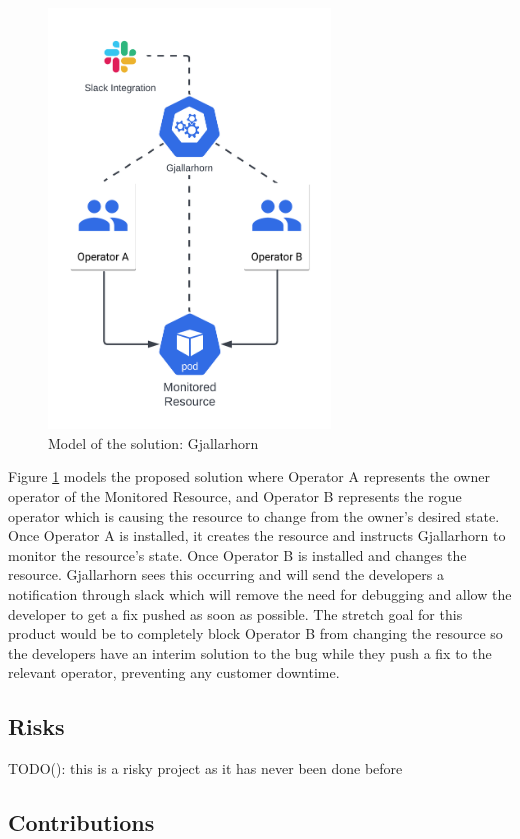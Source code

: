 \documentclass{article}
\begin{document}
\begin{figure}[!hb]
    \centering
    \includegraphics[width=75mm]{solution-model.png}
    \caption{Model of the solution: Gjallarhorn}
    \label{solution-model}
\end{figure}

Figure \ref{solution-model} models the proposed solution where Operator A represents the owner 
operator of the Monitored Resource, and Operator B represents the rogue operator which is 
causing the resource to change from the owner’s desired state. Once Operator A is installed, 
it creates the resource and instructs Gjallarhorn to monitor the resource’s state. Once Operator 
B is installed and changes the resource. Gjallarhorn sees this occurring and will send the 
developers a notification through slack which will remove the need for debugging and allow 
the developer to get a fix pushed as soon as possible. The stretch goal for this product 
would be to completely block Operator B from changing the resource so the developers have an 
interim solution to the bug while they push a fix to the relevant operator, preventing any 
customer downtime.

\subsection{Risks}
TODO(): this is a risky project as it has never been done before 

\subsection{Contributions}
\end{document}
